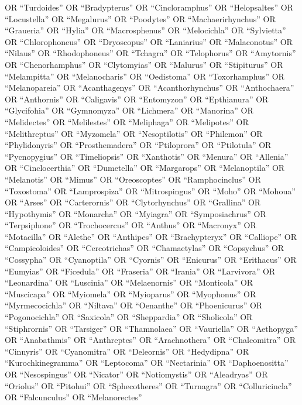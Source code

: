\documentclass[
  number,
  review,
  onecolumn]{elsarticle}
\begin{document}
OR ``Turdoides'' OR ``Bradypterus'' OR ``Cincloramphus'' OR
``Helopsaltes'' OR ``Locustella'' OR ``Megalurus'' OR ``Poodytes'' OR
``Machaerirhynchus'' OR ``Graueria'' OR ``Hylia'' OR ``Macrosphenus'' OR
``Melocichla'' OR ``Sylvietta'' OR ``Chlorophoneus'' OR ``Dryoscopus''
OR ``Laniarius'' OR ``Malaconotus'' OR ``Nilaus'' OR ``Rhodophoneus'' OR
``Tchagra'' OR ``Telophorus'' OR ``Amytornis'' OR ``Chenorhamphus'' OR
``Clytomyias'' OR ``Malurus'' OR ``Stipiturus'' OR ``Melampitta'' OR
``Melanocharis'' OR ``Oedistoma'' OR ``Toxorhamphus'' OR
``Melanopareia'' OR ``Acanthagenys'' OR ``Acanthorhynchus'' OR
``Anthochaera'' OR ``Anthornis'' OR ``Caligavis'' OR ``Entomyzon'' OR
``Epthianura'' OR ``Glycifohia'' OR ``Gymnomyza'' OR ``Lichmera'' OR
``Manorina'' OR ``Melidectes'' OR ``Melilestes'' OR ``Meliphaga'' OR
``Melipotes'' OR ``Melithreptus'' OR ``Myzomela'' OR ``Nesoptilotis'' OR
``Philemon'' OR ``Phylidonyris'' OR ``Prosthemadera'' OR ``Ptiloprora''
OR ``Ptilotula'' OR ``Pycnopygius'' OR ``Timeliopsis'' OR ``Xanthotis''
OR ``Menura'' OR ``Allenia'' OR ``Cinclocerthia'' OR ``Dumetella'' OR
``Margarops'' OR ``Melanoptila'' OR ``Melanotis'' OR ``Mimus'' OR
``Oreoscoptes'' OR ``Ramphocinclus'' OR ``Toxostoma'' OR ``Lamprospiza''
OR ``Mitrospingus'' OR ``Moho'' OR ``Mohoua'' OR ``Arses'' OR
``Carterornis'' OR ``Clytorhynchus'' OR ``Grallina'' OR ``Hypothymis''
OR ``Monarcha'' OR ``Myiagra'' OR ``Symposiachrus'' OR ``Terpsiphone''
OR ``Trochocercus'' OR ``Anthus'' OR ``Macronyx'' OR ``Motacilla'' OR
``Alethe'' OR ``Anthipes'' OR ``Brachypteryx'' OR ``Calliope'' OR
``Campicoloides'' OR ``Cercotrichas'' OR ``Chamaetylas'' OR
``Copsychus'' OR ``Cossypha'' OR ``Cyanoptila'' OR ``Cyornis'' OR
``Enicurus'' OR ``Erithacus'' OR ``Eumyias'' OR ``Ficedula'' OR
``Fraseria'' OR ``Irania'' OR ``Larvivora'' OR ``Leonardina'' OR
``Luscinia'' OR ``Melaenornis'' OR ``Monticola'' OR ``Muscicapa'' OR
``Myiomela'' OR ``Myioparus'' OR ``Myophonus'' OR ``Myrmecocichla'' OR
``Niltava'' OR ``Oenanthe'' OR ``Phoenicurus'' OR ``Pogonocichla'' OR
``Saxicola'' OR ``Sheppardia'' OR ``Sholicola'' OR ``Stiphrornis'' OR
``Tarsiger'' OR ``Thamnolaea'' OR ``Vauriella'' OR ``Aethopyga'' OR
``Anabathmis'' OR ``Anthreptes'' OR ``Arachnothera'' OR ``Chalcomitra''
OR ``Cinnyris'' OR ``Cyanomitra'' OR ``Deleornis'' OR ``Hedydipna'' OR
``Kurochkinegramma'' OR ``Leptocoma'' OR ``Nectarinia'' OR
``Daphoenositta'' OR ``Nesospingus'' OR ``Nicator'' OR ``Notiomystis''
OR ``Aleadryas'' OR ``Oriolus'' OR ``Pitohui'' OR ``Sphecotheres'' OR
``Turnagra'' OR ``Colluricincla'' OR ``Falcunculus'' OR ``Melanorectes''
\end{document}
